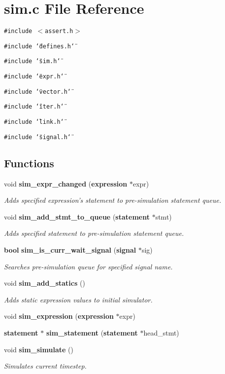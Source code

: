 \section{sim.c File Reference}
\label{sim_8c}
{\tt \#include $<$assert.h$>$}\par
{\tt \#include \char`\"{}defines.h\char`\"{}}\par
{\tt \#include \char`\"{}sim.h\char`\"{}}\par
{\tt \#include \char`\"{}expr.h\char`\"{}}\par
{\tt \#include \char`\"{}vector.h\char`\"{}}\par
{\tt \#include \char`\"{}iter.h\char`\"{}}\par
{\tt \#include \char`\"{}link.h\char`\"{}}\par
{\tt \#include \char`\"{}signal.h\char`\"{}}\par
\subsection*{Functions}
\begin{CompactItemize}
\item 
void {\bf sim\_\-expr\_\-changed} ({\bf expression} $\ast$expr)
\begin{CompactList}\small\item\em Adds specified expression's statement to pre-simulation statement queue. \item\end{CompactList}\item 
void {\bf sim\_\-add\_\-stmt\_\-to\_\-queue} ({\bf statement} $\ast$stmt)
\begin{CompactList}\small\item\em Adds specified statement to pre-simulation statement queue. \item\end{CompactList}\item 
{\bf bool} {\bf sim\_\-is\_\-curr\_\-wait\_\-signal} ({\bf signal} $\ast$sig)
\begin{CompactList}\small\item\em Searches pre-simulation queue for specified signal name. \item\end{CompactList}\item 
void {\bf sim\_\-add\_\-statics} ()
\begin{CompactList}\small\item\em Adds static expression values to initial simulator. \item\end{CompactList}\item 
void {\bf sim\_\-expression} ({\bf expression} $\ast$expr)
\item 
{\bf statement} $\ast$ {\bf sim\_\-statement} ({\bf statement} $\ast$head\_\-stmt)
\item 
void {\bf sim\_\-simulate} ()
\begin{CompactList}\small\item\em Simulates current timestep. \item\end{CompactList}\end{CompactItemize}
